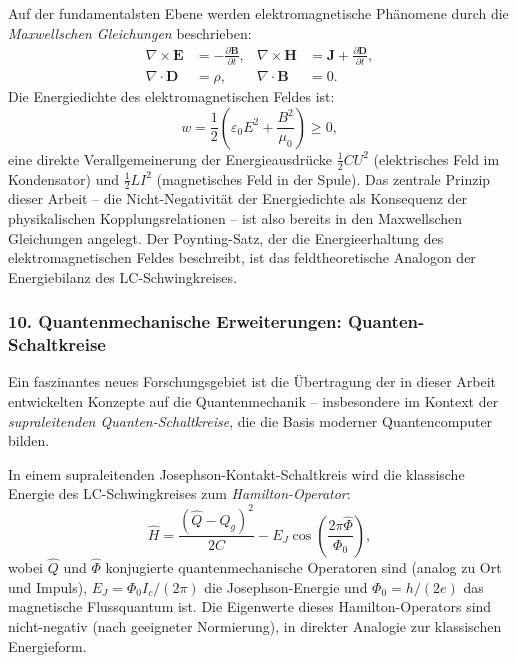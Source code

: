 ﻿\documentclass[12pt, a4paper]{article}
\begin{document}
	Auf der fundamentalsten Ebene werden elektromagnetische Phänomene durch die \textit{Maxwellschen Gleichungen} beschrieben:
	\begin{align}
		\nabla \times \mathbf{E} &= -\frac{\partial \mathbf{B}}{\partial t}, &
		\nabla \times \mathbf{H} &= \mathbf{J} + \frac{\partial \mathbf{D}}{\partial t}, \\
		\nabla \cdot \mathbf{D} &= \rho, &
		\nabla \cdot \mathbf{B} &= 0.
	\end{align}
	Die Energiedichte des elektromagnetischen Feldes ist:
	\begin{equation}
		w = \frac{1}{2}\left(\varepsilon_0 E^2 + \frac{B^2}{\mu_0}\right) \geq 0,
	\end{equation}
	eine direkte Verallgemeinerung der Energieausdrücke $\frac{1}{2}CU^2$ (elektrisches Feld im Kondensator) und $\frac{1}{2}LI^2$ (magnetisches Feld in der Spule). Das zentrale Prinzip dieser Arbeit -- die Nicht-Negativität der Energiedichte als Konsequenz der physikalischen Kopplungsrelationen -- ist also bereits in den Maxwellschen Gleichungen angelegt. Der Poynting-Satz, der die Energieerhaltung des elektromagnetischen Feldes beschreibt, ist das feldtheoretische Analogon der Energiebilanz des LC-Schwingkreises.

	\subsubsection*{10. \quad Quantenmechanische Erweiterungen: Quanten-Schaltkreise}

	Ein faszinantes neues Forschungsgebiet ist die Übertragung der in dieser Arbeit entwickelten Konzepte auf die Quantenmechanik -- insbesondere im Kontext der \textit{supraleitenden Quanten-Schaltkreise}, die die Basis moderner Quantencomputer bilden.

	In einem supraleitenden Josephson-Kontakt-Schaltkreis wird die klassische Energie des LC-Schwingkreises zum \textit{Hamilton-Operator}:
	\begin{equation}
		\hat{H} = \frac{(\hat{Q} - Q_g)^2}{2C} - E_J \cos\left(\frac{2\pi\hat{\Phi}}{\Phi_0}\right),
	\end{equation}
	wobei $\hat{Q}$ und $\hat{\Phi}$ konjugierte quantenmechanische Operatoren sind (analog zu Ort und Impuls), $E_J = \Phi_0 I_c / (2\pi)$ die Josephson-Energie und $\Phi_0 = h/(2e)$ das magnetische Flussquantum ist. Die Eigenwerte dieses Hamilton-Operators sind nicht-negativ (nach geeigneter Normierung), in direkter Analogie zur klassischen Energieform.
\end{document}
